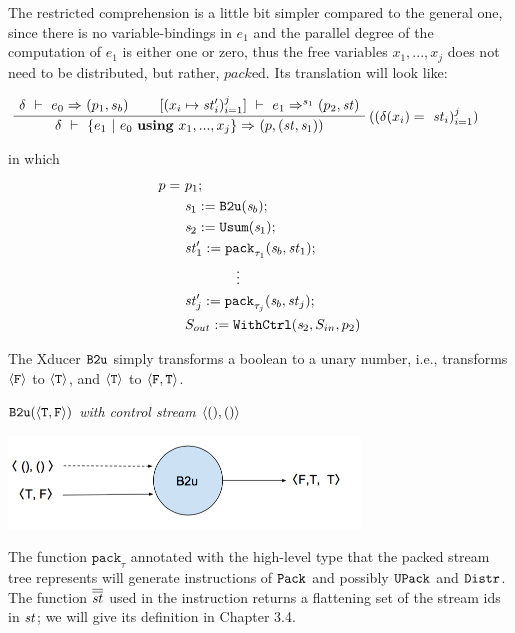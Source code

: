 The restricted comprehension is a little bit simpler compared to the general one, since there is no variable-bindings in $e_1$ and the parallel degree of the computation of $e_1$ is either one or zero, thus the free variables $x_1,...,x_j$ does not need to be distributed, but rather, $pack$ed. Its translation will look like:

$$\PT{
	\AC{\Trans{\del}{e_0}{}{}{(p_1,s_b)}}
	\AC{\Trans{[\j{x_i \|-> \st'_i}]}{e_1}{s_1}{}{\sfun{p_2}{\st}}}
	\RiLa{(\j{\del(x_i) = \ \st_i})}		
	\BC{\Trans{\del}{\RComp{e_1}{e_0}{\usevars}}{}{}
		{ \sfun{p} {(\st,\s_1)}}}
}$$


in which $$ \begin{aligned}
p = & \ p_1; \\
& \ \sdef{\s_1}{\bu(\s_b)}; \\
& \ \sdef{\s_2}{\usum(\s_1)}; \\
& \ \sdef{\st_1'}{\Pack{\s_b}{\st_1}{\tau_1}}; \\
& \qquad \qquad \vdots \\
& \ \sdef{\st_j'}{\Pack{\s_b}{\st_j}{\tau_j}}; \\
& \ \withctrl{\s_2}{p_2}{\Sin}{\Sout} \\
\end{aligned}$$
	
The Xducer $\bu$ simply transforms a boolean to a unary number, i.e.,  transforms $\oF$ to $\oT$, and $\oT$ to $\< \F, \T \'>$.
\begin{example} \emph{$\bu({\<\T,\F\'>})$ with control stream $\< (),() \'>$}\\
\begin{center}
	\includegraphics[width=0.7\textwidth]{b2uxudcer2}
\end{center}
\end{example}

The function $\mathtt{pack}_{\tau}$ annotated with the high-level type  that the packed stream tree represents will generate instructions of $\pack$ and possibly $\upack$ and $\distr$. The function $\olol{st}$  used in the instruction \wc returns a flattening set of the stream ids in $\st$; we will give its definition in Chapter 3.4.

